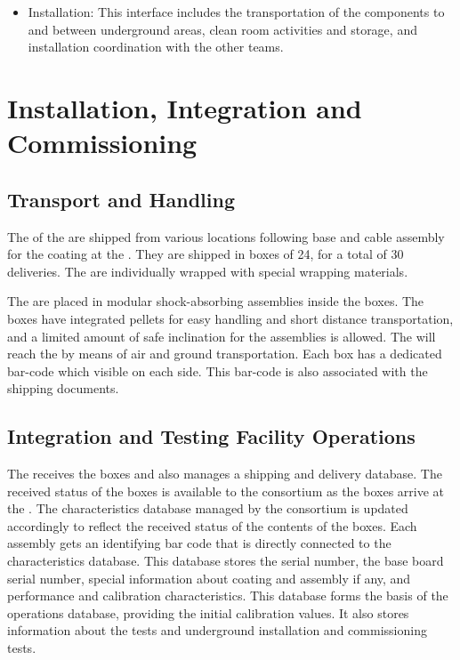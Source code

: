 \begin{itemize}
\item Installation: This interface %
includes the transportation of the  components to and between underground areas, clean room activities and storage, and installation coordination with the other teams. 

\end{itemize}

\section{Installation, Integration and Commissioning}
\label{sec:fddp-pd-9}

\subsection{Transport and Handling}
\label{sec:fddp-pd-9.1}

The \dpnumpmtch {} of the  are shipped from various locations following base and cable assembly for the  coating at the . %
They are shipped in boxes of \num{24}, for a total of \num{30} deliveries.
The  are individually wrapped with special wrapping materials. 

The  are placed in modular shock-absorbing assemblies inside the boxes. %
The boxes have integrated pellets for easy handling and short distance transportation, and a limited amount of safe inclination for the assemblies is allowed. The  will reach the  by means of air and ground transportation. Each box has a dedicated bar-code which visible on each side. This bar-code is also associated with the shipping documents. 

\subsection{Integration and Testing Facility Operations}
\label{sec:fddp-pd-9.2}

The  receives the  boxes and also manages a shipping and delivery database. The received status of the boxes is available to the \dual {} consortium as the boxes arrive at the . The  characteristics database managed by the \dual {} consortium is updated accordingly to reflect the received status of the contents of the boxes. Each  assembly gets an identifying bar code that is directly connected to the  characteristics database. This database stores the  serial number, the base board serial number, special information about  coating and assembly if any, and performance and calibration characteristics. This database  forms the basis of the operations database, providing the initial calibration values. It also stores information about the  tests and underground installation and commissioning tests.

